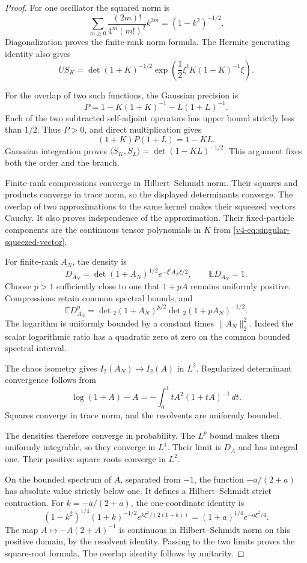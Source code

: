 \begin{proof}
For one oscillator the squared norm is
\[
 \sum_{m\geq0}\frac{(2m)!}{4^m(m!)^2}k^{2m}
                              =(1-k^2)^{-1/2}.
\]
Diagonalization proves the finite-rank norm
formula. The Hermite generating identity also gives
\[
 US_K=\det(1+K)^{-1/2}
          \exp\left(\frac12\xi^tK(1+K)^{-1}\xi\right).
\]

For the overlap of two such functions, the
Gaussian precision is
\[
 P=1-K(1+K)^{-1}-L(1+L)^{-1}.
\]
Each of the two subtracted self-adjoint operators
has upper bound strictly less than \(1/2\).
Thus \(P>0\), and direct multiplication gives
\[
                         (1+K)P(1+L)=1-KL.
\]
Gaussian integration proves
\(\langle S_K,S_L\rangle=\det(1-KL)^{-1/2}\).
This argument fixes both the order and the branch.

Finite-rank compressions converge in Hilbert--Schmidt
norm. Their squares and products converge in
trace norm, so the displayed determinants converge.
The overlap of two approximations to the same
kernel makes their squeezed vectors Cauchy.
It also proves independence of the approximation.
Their fixed-particle components are the
continuous tensor polynomials in \(K\) from
\eqref{v4-eq:singular-squeezed-vector}.

For finite-rank \(A_N\), the density is
\[
 D_{A_N}=\det(1+A_N)^{1/2}e^{-\xi^tA_N\xi/2},
 \qquad \mathbb E D_{A_N}=1.
\]
Choose \(p>1\) sufficiently close to one
that \(1+pA\) remains uniformly positive.
Compressions retain common spectral bounds, and
\[
 \mathbb E D_{A_N}^p
   =\det{}_2(1+A_N)^{p/2}\det{}_2(1+pA_N)^{-1/2}.
\]
The logarithm is uniformly bounded by a
constant times \(\|A_N\|_2^2\).
Indeed the scalar logarithmic ratio has
a quadratic zero at zero on the common
bounded spectral interval.

The chaos isometry gives \(I_2(A_N)\to I_2(A)\)
in \(L^2\). Regularized determinant convergence
follows from
\[
 \log(1+A)-A=-\int_0^1tA^2(1+tA)^{-1}\,dt.
\]
Squares converge in trace norm, and the
resolvents are uniformly bounded.

The densities therefore converge in probability.
The \(L^p\) bound makes them uniformly
integrable, so they converge in \(L^1\).
Their limit is \(D_A\) and has integral one.
Their positive square roots converge in \(L^2\).

On the bounded spectrum of \(A\), separated
from \(-1\), the function \(-a/(2+a)\)
has absolute value strictly below one.
It defines a Hilbert--Schmidt strict contraction.
For \(k=-a/(2+a)\), the one-coordinate identity is
\[
 (1-k^2)^{1/4}(1+k)^{-1/2}
       e^{k\xi^2/(2(1+k))}
                   =(1+a)^{1/4}e^{-a\xi^2/4}.
\]
The map \(A\mapsto-A(2+A)^{-1}\) is continuous
in Hilbert--Schmidt norm on this positive domain,
by the resolvent identity.
Passing to the two limits proves the square-root
formula. The overlap identity follows by unitarity.
\end{proof}

